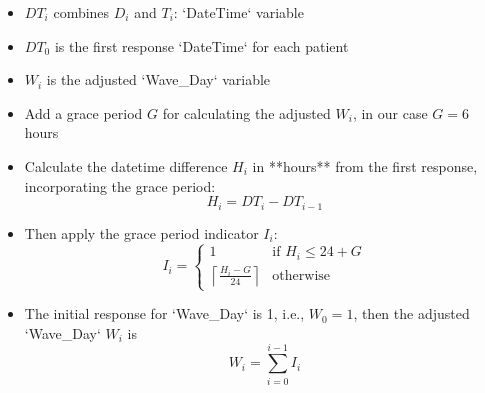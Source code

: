 \documentclass[
  12pt,
]{article}
\begin{document}
\begin{itemize}
  \item $DT_i$ combines $D_i$ and $T_i$: `DateTime` variable
  \item $DT_0$ is the first response `DateTime` for each patient
  \item $W_i$ is the adjusted `Wave\_Day` variable
  \item Add a grace period $G$ for calculating the adjusted $W_i$, in our case $G=6$ hours
  \item Calculate the datetime difference $H_i$ in **hours** from the first response, incorporating the grace period:
  $$
  H_i = DT_i-DT_{i-1}
  $$
  \item Then apply the grace period indicator $I_i$:
  $$
  I_i=
  \begin{cases}
  1 & \text{if } H_{i} \leq 24 + G \\
  \left\lceil\frac{H_{i} - G}{24}\right\rceil & \text{otherwise}
  \end{cases}
  $$
  \item The initial response for `Wave\_Day` is 1, i.e., $W_0=1$, then the adjusted `Wave\_Day` $W_i$ is 
  $$
  W_i=\sum_{i=0}^{i-1} I_i
  $$
\end{itemize}
\end{document}
